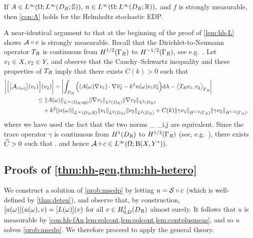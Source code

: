 \label{lem:hh-A}

\noindent If $A \in \LiOLiDRRRdtd,$ $n \in \LiOLiDRRR,$ and $f$ is strongly measurable, then \cref{con:A} holds for the Helmholtz stochastic EDP.
\ele

A near-identical argument to that at the beginning of the proof of \cref{lem:hh-L} shows $\mathcal A\circ c$ is strongly measurable. Recall that the Dirichlet-to-Neumann operator $T_{R}$ is continuous from $\HhGR$ to $\HmhGR,$ see e.g.~\cite[Theorem 2.6.4]{Ne:01}. Let $v_{1} \in X, v_{2} \in Y,$ and observe that the Cauchy--Schwartz inequality and these properties of $T_{R}$
imply that there exists $C(k) > 0$ such that 
\begin{align*}
\bigg|\Big[\mleft[\Acomega\mright](\vo)\Big](\vt)\bigg| &= \abs{\int_{\DR} \Big(\mleft(A(\omega) \grad \vo\mright)\cdot\grad \vtb - k^2n(\omega) \vo\vtb \Big)\dd\Leb- \IPGRbig{\DtN \vo}{\vt}}\\
&\hspace{-1cm}\leq \NLiDRRRdtd{A(\omega)}  \NLtDR{\grad \vo}\NLtDR{\grad \vt}\\
&\hspace{-1cm}\quad+ k^2 \NLiDRRR{n(\omega)}\NLtDR{\vo}\NLtDR{\vt}+ C(k) \NHhGR{\gamma\vo}\NHhGR{\gamma\vt},
\end{align*}
where we have used the fact that the two norms
\beq\label{eq:normsdef}
 \esssup_{\bx \in \DR}  \quad\tand\quad{} \de \max_{i,j \in {}} 
\eeq
are equivalent.
Since the trace operator $\gamma$ is continuous from $\HoDR$ to $\HhGR$ (see, e.g.~\cite[Theorem 3.38]{Mc:00}), there exists $\widetilde{C} > 0$ such that
\beqs
\Nhomspace{\mleft(\toform\circ\coeff\mright)(\omega)}\leq\Ctilde\max{}\NHokDR{\vo}\NHokDR{\vt}.
\eeqs
and hence $\toform\circ\coeff \in \LiOhomspace.$
\epf

\subsection{Proofs of \cref{thm:hh-gen,thm:hh-hetero}}\label{sec:applying}

We construct a solution of \cref{prob:msedp} by letting $u = \mathcal S\circ c$ (which is well-defined by \cref{thm:deteu}), and observe that, by construction, $\mleft[a(\omega)\mright]\mleft(u(\omega),v\mright) = \mleft[L(\omega)\mright](v)$ for all $v \in \HozDDR$ almost surely. It follows that $u$ is measurable by \cref{con:hh-fAn,lem:solcont,lem:solcont,lem:contplusmeas}, and so $u$ solves \cref{prob:msedp}. We therefore proceed to apply the general theory.

